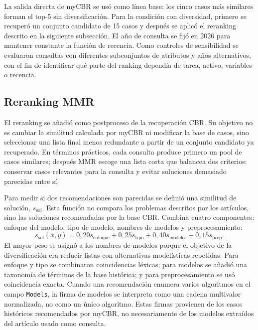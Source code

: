 \documentclass[11pt,a4paper]{article}
\newcommand{\myCBR}{myCBR}
\begin{document}
La salida directa de \myCBR{} se usó como línea base: los cinco casos más similares forman el top-5 sin diversificación. Para la condición con diversidad, primero se recuperó un conjunto candidato de 15 casos y después se aplicó el reranking descrito en la siguiente subsección. El año de consulta se fijó en 2026 para mantener constante la función de recencia. Como controles de sensibilidad se evaluaron consultas con diferentes subconjuntos de atributos y años alternativos, con el fin de identificar qué parte del ranking dependía de tarea, activo, variables o recencia.

\subsection{Reranking MMR}
\label{sec:mmr}

El reranking se añadió como postproceso de la recuperación CBR. Su objetivo no es cambiar la similitud calculada por \myCBR{} ni modificar la base de casos, sino seleccionar una lista final menos redundante a partir de un conjunto candidato ya recuperado. En términos prácticos, cada consulta produce primero un pool de casos similares; después MMR escoge una lista corta que balancea dos criterios: conservar casos relevantes para la consulta y evitar soluciones demasiado parecidas entre sí.

Para medir si dos recomendaciones son parecidas se definió una similitud de solución, $s_{\mathrm{sol}}$. Esta función no compara los problemas descritos por los artículos, sino las soluciones recomendadas por la base CBR. Combina cuatro componentes: enfoque del modelo, tipo de modelo, nombres de modelos y preprocesamiento:
\begin{equation}
 s_{\mathrm{sol}}(x,y)=0{,}20s_{\mathrm{enfoque}}+0{,}25s_{\mathrm{tipo}}+0{,}40s_{\mathrm{modelos}}+0{,}15s_{\mathrm{prep}}.
 \label{eq:solution-sim}
\end{equation}
El mayor peso se asignó a los nombres de modelos porque el objetivo de la diversificación era reducir listas con alternativas modelísticas repetidas. Para enfoque y tipo se combinaron coincidencias léxicas; para modelos se añadió una taxonomía de términos de la base histórica; y para preprocesamiento se usó coincidencia exacta. Cuando una recomendación enumera varios algoritmos en el campo \texttt{Models}, la firma de modelos se interpreta como una cadena multivalor normalizada, no como un único algoritmo. Estas firmas provienen de los casos históricos recomendados por \myCBR{}, no necesariamente de los modelos extraídos del artículo usado como consulta.
\end{document}
